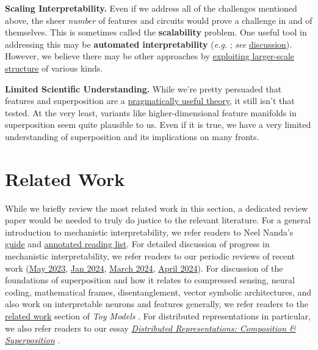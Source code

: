 \documentclass{article}
\let\oldsection\section
\renewcommand{\section}{\FloatBarrier\oldsection}
\begin{document}
\textbf{Scaling Interpretability.} Even if we address all of the challenges mentioned above, the sheer \textit{number} of features and circuits would prove a challenge in and of themselves. This is sometimes called the \textbf{scalability} problem. One useful tool in addressing this may be \textbf{automated interpretability} (\textit{e.g.} \cite{bills2023language,hernandez2021natural}; \textit{see} \href{https://transformer-circuits.pub/2023/interpretability-dreams/index.html\#automated-interpretability}{discussion}). However, we believe there may be other approaches by \href{https://transformer-circuits.pub/2023/interpretability-dreams/index.html\#larger-scale}{exploiting larger-scale structure} of various kinds.

\textbf{Limited Scientific Understanding.} While we're pretty persuaded that features and superposition are a \href{https://transformer-circuits.pub/2024/april-update/index.html\#caloric-theory}{pragmatically useful theory}, it still isn't that tested. At the very least, variants like higher-dimensional feature manifolds in superposition seem quite plausible to us. Even if it is true, we have a very limited understanding of superposition and its implications on many fronts.

\section{Related Work}\label{sec:related-work}

While we briefly review the most related work in this section, a dedicated review paper would be needed to truly do justice to the relevant literature. For a general introduction to mechanistic interpretability, we refer readers to Neel Nanda's \href{https://www.neelnanda.io/mechanistic-interpretability/getting-started}{guide} and \href{https://www.neelnanda.io/mechanistic-interpretability/favourite-papers}{annotated reading list}. For detailed discussion of progress in mechanistic interpretability, we refer readers to our periodic reviews of recent work (\href{https://transformer-circuits.pub/2023/may-update/index.html\#external-research}{May 2023}, \href{https://transformer-circuits.pub/2024/jan-update/index.html\#external-research}{Jan 2024}, \href{https://transformer-circuits.pub/2024/march-update/index.html\#external-research}{March 2024}, \href{https://transformer-circuits.pub/2024/april-update/index.html\#external-research}{April 2024}). For discussion of the foundations of superposition and how it relates to compressed sensing, neural coding, mathematical frames, disentanglement, vector symbolic architectures, and also work on interpretable neurons and features generally, we refer readers to the \href{https://transformer-circuits.pub/2022/toy_model/index.html\#related}{related work} section of \textit{Toy Models} \cite{elhage2022superposition}. For distributed representations in particular, we also refer readers to our essay \textit{\href{https://transformer-circuits.pub/2023/superposition-composition/index.html}{Distributed Representations: Composition \& Superposition}} \cite{olah2023distributed}.
\end{document}
